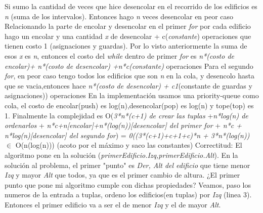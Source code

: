 \documentclass{article}
\begin{document}
Si sumo la cantidad de veces que hice desencolar en el recorrido de los edificios es \textit{n} (suma de los intervalos).
Entonces hago \textit{n} veces desencolar en peor caso 
Relacionando la parte de encolar y desencolar en el primer \textit{for}
por cada edificio hago un encolar y una cantidad \textit{x} de desencolar + c(\textit{constante}) operaciones que tienen costo 1 (asignaciones y guardas).\newline
Por lo visto anteriormente la suma de esos \textit{x} es \textit{n}, entonces el costo del \textit{while} dentro de primer \textit{for} es  \textit{n*(costo de encolar)+ n*(costo de desencolar) +n*c(constante)} operaciones
\newline
Para  el segundo \textit{for}, en peor caso tengo todos los edificios que son \textit{n} en la cola, y desencolo hasta que se vacia,entonces hace \textit{n*(costo de desencolar) + c1}(constante de guardas y asignaciones)) operaciones\newline
En la implementación usamos una priority-queue como cola, el costo de encolar(push) es log(n),desencolar(pop) es log(n) y tope(top) es 1. \color{red}{LINKS} \color{black}
\newline
Finalmente la complejidad es \newline
O(\textit{3*n*(c+1) de crear las tuplas}\newline
+\textit{n*log(n) de ordenarlos} \newline
+ \textit{n*c+n[\textit{encolar}]+n*(log(n))[\textit{desencolar}] del primer for} \newline
+ \textit{n*c + n*log(n)[\textit{desencolar}] del segundo for})  = \newline
\textit{0((3*(c+1)+c+1+c)*n + 3*n*(log(n))} \newline
$\in$ O(n(log(n))) (acoto por el máximo y saco las constantes)\newline
\newpage
{\noindent \Huge Correctitud:}
\newline \newline
El algoritmo pone en la solución (\textit{primerEdificio.Izq,primerEdificio.Alt}).\newline
En la solución al problema, el primer "punto" es \textit{Der, Alt del edificio} que tiene menor \textit{Izq} y mayor \textit{Alt} que todos, ya que es el primer cambio de altura.
¿El primer punto que pone mi algoritmo cumple con dichas propiedades?
Veamos, paso los numeros de la entrada a tuplas, ordeno los edificios(en tuplas) por \textit{Izq} (linea 3).
Entonces el primer edificio va a ser el de menor \textit{Izq} y el de mayor \textit{Alt}.\newline
\end{document}
